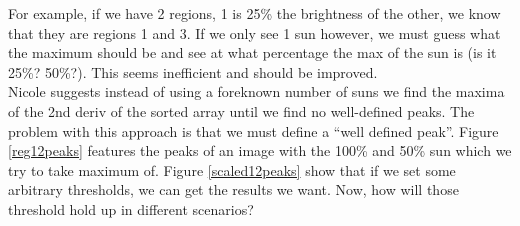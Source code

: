 \documentclass[10pt]{scrartcl}
\begin{document}
For example, if we have 2 regions, 1 is 25\% the brightness of the other, we know that they are regions 1 and 3. If we only see 1 sun however, we must guess what the maximum should be and see at what percentage the max of the sun is (is it 25\%? 50\%?). This seems inefficient and should be improved. \\

Nicole suggests instead of using a foreknown number of suns we find the maxima of the 2nd deriv of the sorted array until we find no well-defined peaks. The problem with this approach is that we must define a ``well defined peak''. Figure \ref{reg12peaks} features the peaks of an image with the 100\% and 50\% sun which we try to take maximum of. Figure \ref{scaled12peaks} show that if we set some arbitrary thresholds, we can get the results we want. Now, how will those threshold hold up in different scenarios?


\end{document}
